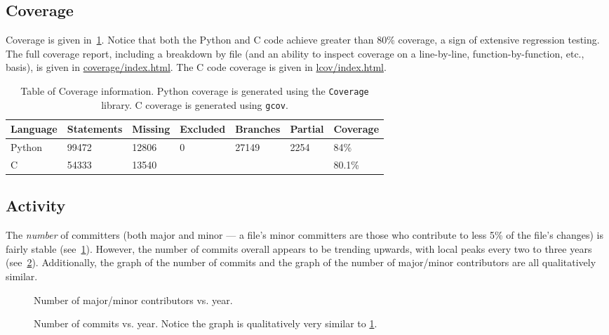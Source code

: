 \documentclass{article}
\begin{document}
\subsection{Coverage}
Coverage is given in~\cref{tbl:coverage}. Notice that both the Python and C code achieve greater than 80\% coverage,
a sign of extensive regression testing. The full coverage report, including a breakdown by file (and an ability to inspect
coverage on a line-by-line, function-by-function, etc., basis), is given in \href{https://patdak.github.io/pat-project/coverage/index.html}{coverage/index.html}. The C code coverage
is given in \href{https://patdak.github.io/pat-project/lcov/index.html}{lcov/index.html}.
\begin{table}[H]
\centering
\begin{tabular}{lllllll}
Language & Statements & Missing & Excluded & Branches & Partial & Coverage\\\toprule
Python & 99472 & 12806 & 0 & 27149 & 2254 & 84\%\\
C & 54333 & 13540 & & & & 80.1\%
\end{tabular}
\caption{Table of Coverage information. Python coverage is generated
using the \texttt{Coverage} library\cite{python-coverage}. C coverage is generated using \texttt{gcov}\cite{gcov}.}
\label{tbl:coverage}
\end{table}

\subsection{Activity}
The \emph{number} of committers (both major and minor --- a file's minor committers are those
who contribute to less 5\% of the file's changes) is fairly stable (see~\cref{fig:contributors_vs_year}). However, the number of commits
overall appears to be trending upwards, with local peaks every two to three years (see~\cref{fig:activity}). Additionally,
the graph of the number of commits and the graph of the number of major/minor contributors are all qualitatively similar.

\begin{figure}[H]
    \centering
    
    \caption{Number of major/minor contributors vs. year.}
    \label{fig:contributors_vs_year}
\end{figure}

\begin{figure}[H]
    \centering
    
    \caption{Number of commits vs. year. Notice the graph is qualitatively very similar to
    \cref{fig:contributors_vs_year}.}
    \label{fig:activity}
\end{figure}
\end{document}
